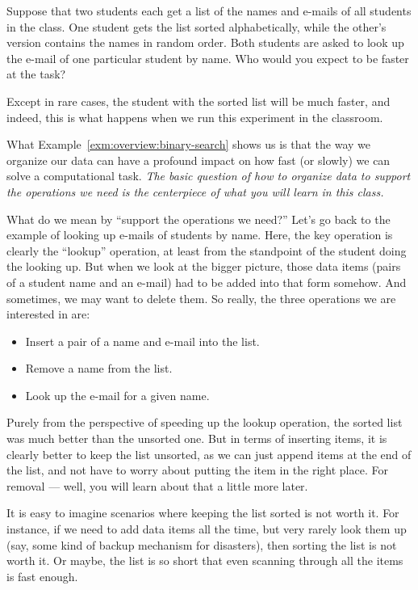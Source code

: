 \begin{example} \label{exm:overview:binary-search}
Suppose that two students each get a list of the names and e-mails of
all students in the class.
One student gets the list sorted alphabetically,
while the other's version contains the names in random order.
Both students are asked to look up the e-mail of one particular
student by name.
Who would you expect to be faster at the task?

Except in rare cases, the student with the sorted list will be much
faster, and indeed, this is what happens when we run this experiment
in the classroom. 
\end{example}

What Example~\ref{exm:overview:binary-search}
shows us is that the way we organize our data can have a profound
impact on how fast (or slowly) we can solve a computational task. 
\emph{The basic question of how to organize data to support the
  operations we need is the centerpiece of what you will learn in this
  class.}

What do we mean by ``support the operations we need?''
Let's go back to the example of looking up e-mails of students by name.
Here, the key operation is clearly the ``lookup'' operation,
at least from the standpoint of the student doing the looking up.
But when we look at the bigger picture,
those data items (pairs of a student name and an e-mail) had to be
added into that form somehow.
And sometimes, we may want to delete them.
So really, the three operations we are interested in are:

\begin{itemize}
\item Insert a pair of a name and e-mail into the list.
\item Remove a name from the list.
\item Look up the e-mail for a given name.
\end{itemize}

Purely from the perspective of speeding up the lookup operation,
the sorted list was much better than the unsorted one.
But in terms of inserting items, it is clearly better to keep the list
unsorted, as we can just append items at the end of the list, and not
have to worry about putting the item in the right place.
For removal --- well, you will learn about that a little more later.

It is easy to imagine scenarios where keeping the list sorted is not
worth it.
For instance, if we need to add data items all the time,
but very rarely look them up (say, some kind of backup mechanism for
disasters), then sorting the list is not worth it.
Or maybe, the list is so short that even scanning through all the
items is fast enough.

